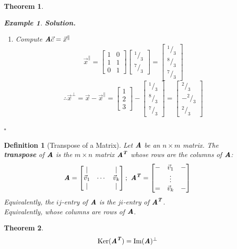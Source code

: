 \documentclass[12pt, a4paper]{article}
\newtheorem{thm}{Theorem}[subsection]
\newtheorem{df}{Definition}[subsection]
\newtheorem{eg}{Example}[subsection]
\newenvironment*{sol}{\indent\textbf{Solution. }}{\hfill{$\square$}\par}
\def\T{{\textbf{\emph{T}}}}
\def\IM{{\mathrm{Im}}}
\def\Ker{\mathrm{Ker}}
\def\vecx{\vec{x}}
\def\vecv{\vec{v}}
\def\matrixA{\textbf{\emph{A}}}
\begin{document}
\begin{thm}
\begin{eg}
\begin{sol}
\begin{enumerate}
				\item Compute $\matrixA\vec{c}=\vecx^\parallel$
				\[\vecx^\parallel=\begin{bmatrix}1&0\\1&1\\0&1\end{bmatrix}\begin{bmatrix}^1/_3\\^7/_3\end{bmatrix}=\begin{bmatrix}^1/_3\\^8/_3\\^7/_3\end{bmatrix}\]
				\[\therefore\vecx^\perp=\vecx-\vecx^\parallel=\begin{bmatrix}1\\2\\3\end{bmatrix}-\begin{bmatrix}^1/_3\\^8/_3\\^7/_3\end{bmatrix}=\begin{bmatrix}^2/_3\\-^2/_3\\^2/_3\end{bmatrix}\]
			\end{enumerate}
		\end{sol}
	\end{eg}
\end{thm}
\begin{df}[Transpose of a Matrix]
	Let $\matrixA$ be an $n\times m$ matrix. The \textbf{transpose} of $\matrixA$ is the $m\times n$ matrix $\matrixA^\T$ whose rows are the columns of $\matrixA$: \[\matrixA=\begin{bmatrix}|&&|\\\vecv_1&\cdots&\vecv_k\\|&&|\end{bmatrix};\ \matrixA^\T=\begin{bmatrix}-&\vecv_1&-\\&\vdots&\\=&\vecv_k&-\end{bmatrix}\]	
	Equivalently, the $ij$-entry of $\matrixA$ is the $ji$-entry of $\matrixA^\T$.\\
	Equivalently, whose columns are rows of $\matrixA$.
\end{df}
\begin{thm}
	\[\Ker(\matrixA^\T)=\IM(\matrixA)^\perp\]	
\end{thm}
\end{document}
